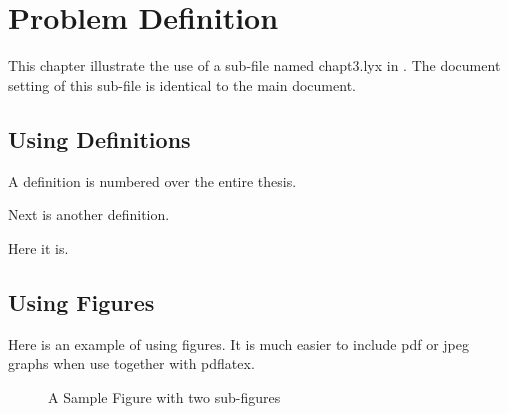 
\chapter{Problem Definition}

This chapter illustrate the use of a sub-file named chapt3.lyx in
\LyX{}. The document setting of this sub-file is identical to the
main document. 


\section{Using Definitions}
\begin{defn}
A definition is numbered over the entire thesis.
\end{defn}
Next is another definition.
\begin{defn}
Here it is.
\end{defn}

\section{Using Figures}

Here is an example of using figures. It is much easier to include
pdf or jpeg graphs when use \LyX{} together with pdflatex.

\begin{figure}
\noindent \begin{centering}
 
\par\end{centering}

\caption{A Sample Figure with two sub-figures}
\end{figure}

